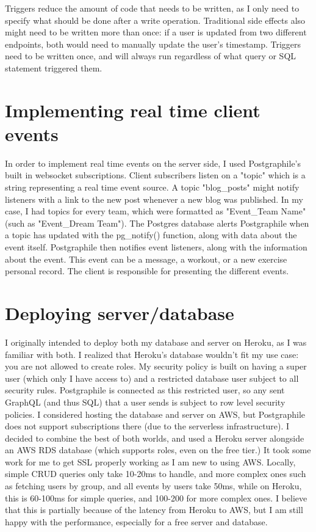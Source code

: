 \documentclass{l4proj}
\begin{document}
Triggers reduce the amount of code that needs to be written, as I only need to specify what should be done after a write operation. Traditional side effects also might need to be written more than once: if a user is updated from two different endpoints, both would need to manually update the user's timestamp. Triggers need to be written once, and will always run regardless of what query or SQL statement triggered them.

\section{Implementing real time client events}
In order to implement real time events on the server side, I used Postgraphile's built in websocket subscriptions. Client subscribers listen on a "topic" which is a string representing a real time event source. A topic "blog\_posts" might notify listeners with a link to the new post whenever a new blog was published. In my case, I had topics for every team, which were formatted as "Event\_{Team Name}" (such as "Event\_Dream Team"). The Postgres database alerts Postgraphile when a topic has updated with the pg\_notify() function, along with data about the event itself. Postgraphile then notifies event listeners, along with the information about the event. This event can be a message, a workout, or a new exercise personal record. The client is responsible for presenting the different events. 

\section{Deploying server/database}
I originally intended to deploy both my database and server on Heroku, as I was familiar with both. I realized that Heroku's database wouldn't fit my use case: you are not allowed to create roles. My security policy is built on having a super user (which only I have access to) and a restricted database user subject to all security rules. Postgraphile is connected as this restricted user, so any sent GraphQL (and thus SQL) that a user sends is subject to row level security policies. I considered hosting the database and server on AWS, but Postgraphile does not support subscriptions there (due to the serverless infrastructure). I decided to combine the best of both worlds, and used a Heroku server alongside an AWS RDS database (which supports roles, even on the free tier.) It took some work for me to get SSL properly working as I am new to using AWS. Locally, simple CRUD queries only take 10-20ms to handle, and more complex ones such as fetching users by group, and all events by users take 50ms, while on Heroku, this is 60-100ms for simple queries, and 100-200 for more complex ones. I believe that this is partially because of the latency from Heroku to AWS, but I am still happy with the performance, especially for a free server and database.
\end{document}
